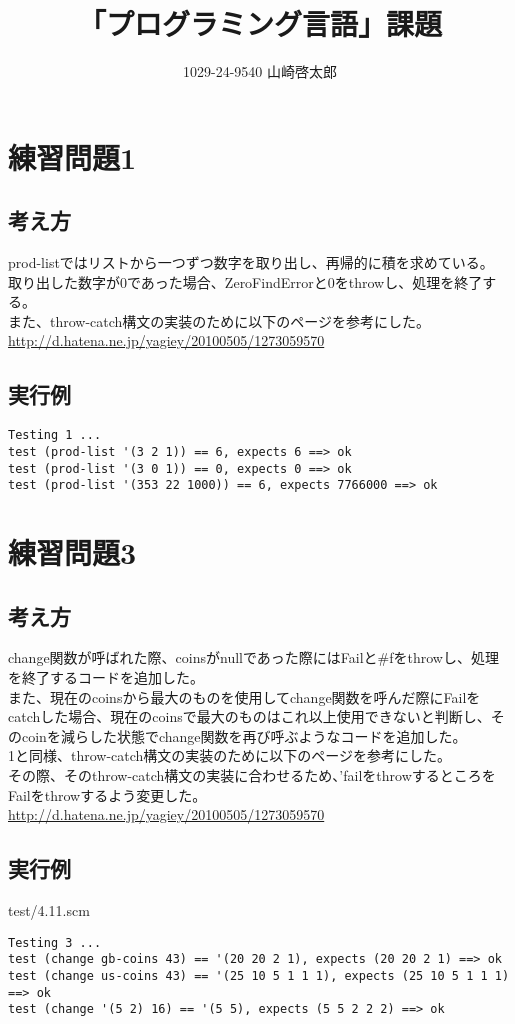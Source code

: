 \documentclass[a4paper,12pt]{article}
\title{「プログラミング言語」課題}
\author{1029-24-9540 山崎啓太郎}
\begin{document}
\lstset{numbers=left,basicstyle=\small}
\maketitle

\section{練習問題1}
\subsection{考え方}
prod-listではリストから一つずつ数字を取り出し、再帰的に積を求めている。\\
取り出した数字が0であった場合、ZeroFindErrorと0をthrowし、処理を終了する。\\
また、throw-catch構文の実装のために以下のページを参考にした。\\
\url{http://d.hatena.ne.jp/yagiey/20100505/1273059570}\\
\subsection{実行例}
{\small
\begin{verbatim}
Testing 1 ...                                                    
test (prod-list '(3 2 1)) == 6, expects 6 ==> ok
test (prod-list '(3 0 1)) == 0, expects 0 ==> ok
test (prod-list '(353 22 1000)) == 6, expects 7766000 ==> ok
\end{verbatim}
}

\section{練習問題3}
\subsection{考え方}
change関数が呼ばれた際、coinsがnullであった際にはFailと\#fをthrowし、処理を終了するコードを追加した。\\
また、現在のcoinsから最大のものを使用してchange関数を呼んだ際にFailをcatchした場合、現在のcoinsで最大のものはこれ以上使用できないと判断し、そのcoinを減らした状態でchange関数を再び呼ぶようなコードを追加した。\\
1と同様、throw-catch構文の実装のために以下のページを参考にした。\\
その際、そのthrow-catch構文の実装に合わせるため、'failをthrowするところをFailをthrowするよう変更した。\\
\url{http://d.hatena.ne.jp/yagiey/20100505/1273059570}\\
\subsection{実行例}
test/4.11.scm\\
{\small
\begin{verbatim}
Testing 3 ...                                                    
test (change gb-coins 43) == '(20 20 2 1), expects (20 20 2 1) ==> ok
test (change us-coins 43) == '(25 10 5 1 1 1), expects (25 10 5 1 1 1) ==> ok
test (change '(5 2) 16) == '(5 5), expects (5 5 2 2 2) ==> ok
\end{verbatim}
}
\end{document}
